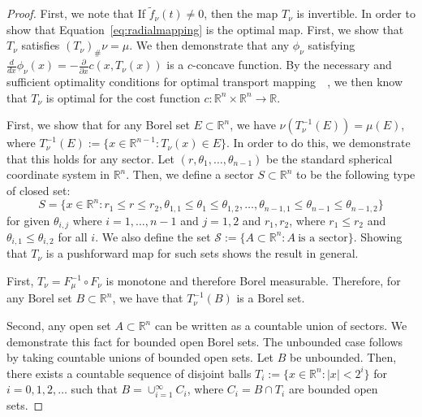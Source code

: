 \documentclass{amsart}
\theoremstyle{lemma}
\theoremstyle{remark}
\begin{document}
\begin{proof}

First, we note that If $\tilde{f}_{\nu}(t) \neq 0$, then the map $T_{\nu}$ is invertible. In order to show that Equation~\eqref{eq:radialmapping} is the optimal map. First, we show that $T_{\nu}$ satisfies $(T_{\nu})_{\#}\nu = \mu$. We then demonstrate that any $\phi_{\nu}$ satisfying $\frac{d}{dx} \phi_{\nu}(x)= -\frac{\partial }{ \partial x} c(x,T_{\nu}(x))$ is a $c$-concave function. By the necessary and sufficient optimality conditions for optimal transport mapping~\cite{MTW}~\cite{LoeperReg}, we then know that $T_{\nu}$ is optimal for the cost function $c:\mathbb{R}^n \times \mathbb{R}^n \rightarrow \mathbb{R}$.

First, we show that for any Borel set $E \subset \mathbb{R}^{n}$, we have $\nu(T_{\nu}^{-1}(E)) = \mu(E)$, where $T_{\nu}^{-1}(E) := \{ x \in \mathbb{R}^{n-1}: T_{\nu}(x) \in E \}$. In order to do this, we demonstrate that this holds for any sector. Let $(r, \theta_1, \dots, \theta_{n-1})$ be the standard spherical coordinate system in $\mathbb{R}^n$. Then, we define a sector $S \subset \mathbb{R}^n$ to be the following type of closed set:
\begin{equation}\label{eq:radialchunk}
S = \{x \in \mathbb{R}^n : r_1 \leq r \leq r_2, \theta_{1, 1} \leq \theta_{1} \leq \theta_{1, 2} , \dots, \theta_{n-1, 1} \leq \theta_{n-1} \leq \theta_{n-1, 2} \}
\end{equation}
for given $\theta_{i, j}$ where $i = 1, \dots, n-1$ and $j = 1, 2$ and $r_1, r_2$, where $r_1 \leq r_2$ and $\theta_{i, 1} \leq \theta_{i, 2}$ for all $i$. We also define the set $\mathcal{S} :=\{ A \subset \mathbb{R}^n : A \ \text{is a sector} \}$. Showing that $T_{\nu}$ is a pushforward map for such sets shows the result in general.

First, $T_{\nu} = F_{\mu}^{-1} \circ F_{\nu}$ is monotone and therefore Borel measurable. Therefore, for any Borel set $B \subset \mathbb{R}^n$, we have that $T_{\nu}^{-1}(B)$ is a Borel set.

Second, any open set $A \subset \mathbb{R}^n$ can be written as a countable union of sectors. We demonstrate this fact for bounded open Borel sets. The unbounded case follows by taking countable unions of bounded open sets. Let $B$ be unbounded. Then, there exists a countable sequence of disjoint balls $T_i := \{ x \in \mathbb{R}^n : \vert x \vert < 2^{i} \}$ for $i=0, 1, 2, \dots$ such that $B = \cup_{i=1}^{\infty} C_i$, where $C_i = B \cap T_{i}$ are bounded open sets.


\end{proof}
\end{document}
